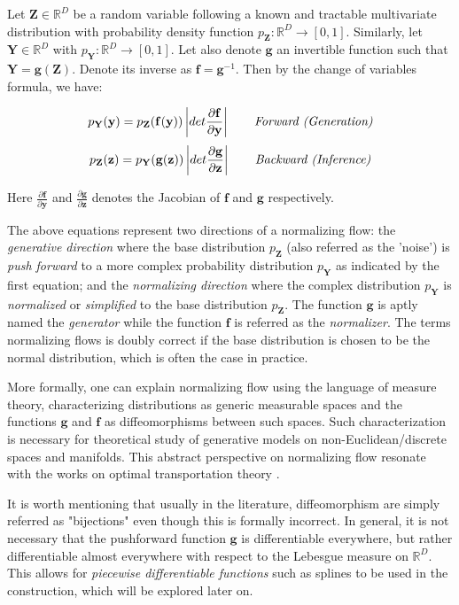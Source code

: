 Let $\mathbf{Z} \in \mathbb{R}^D $ be a random variable following a known and
tractable multivariate distribution with probability density function
$p_{\mathbf{Z}}: \mathbb{R}^D \to [0,1]$. Similarly, let $\mathbf{Y} \in
\mathbb{R}^D$ with $p_{\mathbf{Y}}: \mathbb{R}^D \to [0,1]$. Let also denote
$\mathbf{g}$ an invertible function such that $\mathbf{Y} = \mathbf{g}(\mathbf{Z})$.
Denote its inverse as $\mathbf{f} = \mathbf{g}^{-1}$. Then by the change of
variables formula, we have:

$$
  p_{\mathbf{Y}}(\mathbf{y}) = p_{\mathbf{Z}}(\mathbf{f}(\mathbf{y})) \left|det
  \frac{\partial \mathbf{f}}{\partial \mathbf{y} } \right| \quad \quad
  \text{\textit{Forward (Generation)}}
$$
$$
  p_{\mathbf{Z}}(\mathbf{z}) = p_{\mathbf{Y}}(\mathbf{g}(\mathbf{z})) \left|det
  \frac{\partial \mathbf{g}}{\partial \mathbf{z} } \right| \quad \quad
  \text{\textit{Backward (Inference)}}
$$

Here $\frac{\partial \mathbf{f}}{\partial \mathbf{y} }$ and $\frac{\partial
\mathbf{g}}{\partial \mathbf{z} }$ denotes the Jacobian of $\mathbf{f}$ and
$\mathbf{g}$ respectively.

The above equations represent two directions of a normalizing flow:
the \textit{generative direction} where the base
distribution $p_{\mathbf{Z}}$ (also referred as the 'noise') is \textit{push forward} to a more complex probability
distribution $p_{\mathbf{Y}}$ as indicated by the first equation; and the \textit{normalizing
direction} where the complex distribution $p_{\mathbf{Y}}$ is \textit{normalized} or
\textit{simplified} to the base distribution $p_{\mathbf{Z}}$. The function $\mathbf{g}$ is
aptly named the \textit{generator} while the function $\mathbf{f}$ is
referred as the \textit{normalizer}. The terms normalizing flows is doubly
correct if the base distribution is chosen to be the normal distribution,
which is often the case in practice.

More formally, one can explain normalizing flow using the language of measure
theory, characterizing distributions as generic measurable spaces and the
functions $\mathbf{g}$ and $\mathbf{f}$ as diffeomorphisms between such spaces.
Such characterization is necessary for theoretical study of generative models on
non-Euclidean/discrete spaces and manifolds. This abstract perspective on
normalizing flow resonate with the works on optimal transportation theory \cite{villaniTopicsOptimalTransportation2003}.

It is worth mentioning that usually in the literature, diffeomorphism are simply
referred as "bijections" even though this is formally incorrect. In general, it
is not necessary that the pushforward function $\mathbf{g}$ is differentiable
everywhere, but rather differentiable almost everywhere with respect to the
Lebesgue measure on $\mathbb{R}^D$. This allows for \textit{piecewise
differentiable functions} such as splines to be used in the construction, which
will be explored later on.

